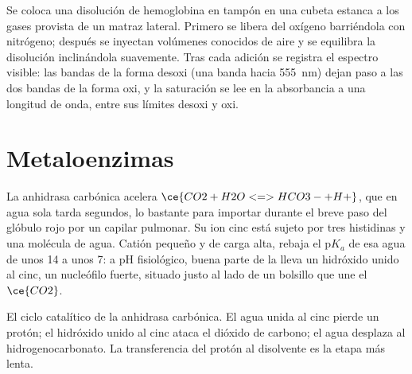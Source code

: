 \begin{inthelab}
Se coloca una disolución de hemoglobina en tampón en una cubeta estanca a los gases provista
de un matraz lateral. Primero se libera del oxígeno barriéndola con nitrógeno; después
se inyectan volúmenes conocidos de aire y se equilibra la disolución inclinándola
suavemente. Tras cada adición se registra el espectro visible: las bandas de
la forma desoxi (una banda hacia \qty{555}{nm}) dejan paso a las dos bandas de la forma oxi,
y la saturación se lee en la absorbancia a una longitud de onda, entre sus límites
desoxi y oxi.
\end{inthelab}

\section{Metaloenzimas}

La anhidrasa carbónica acelera $\ce{CO2 + H2O <=> HCO3- + H+}$, que en agua sola tarda
segundos, lo bastante para importar durante el breve paso del glóbulo rojo por un capilar
pulmonar. Su ion cinc está sujeto por tres histidinas y una molécula de agua. Catión
pequeño y de carga alta, rebaja el $\mathrm pK_a$ de esa agua de unos 14 a
unos 7: a pH fisiológico, buena parte de la  lleva un hidróxido unido al cinc,
un nucleófilo fuerte, situado justo al lado de un bolsillo que une el $\ce{CO2}$.

\begin{omfigure}

{\small El ciclo catalítico de la anhidrasa carbónica. El agua unida al cinc pierde un
protón; el hidróxido unido al cinc ataca el dióxido de carbono; el agua desplaza al
hidrogenocarbonato. La transferencia del protón al disolvente es la etapa más lenta.}
\end{omfigure}

